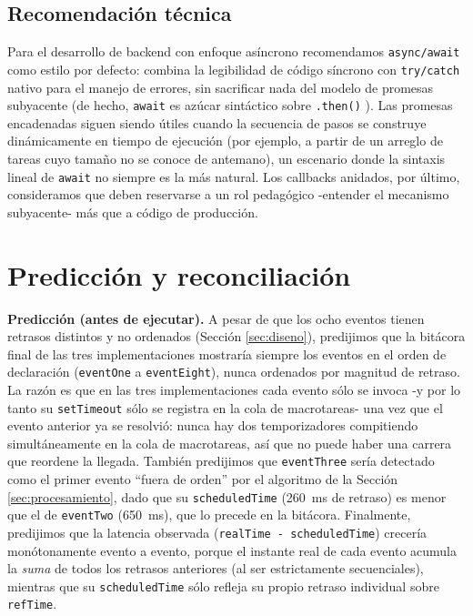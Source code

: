 \documentclass[conference,a4paper]{IEEEtran}
\begin{document}
\subsection{Recomendaci\'on t\'ecnica}
Para el desarrollo de backend con enfoque as\'incrono recomendamos \texttt{async/await} como estilo por defecto: combina la legibilidad de c\'odigo s\'incrono con \texttt{try/catch} nativo para el manejo de errores, sin sacrificar nada del modelo de promesas subyacente (de hecho, \texttt{await} es az\'ucar sint\'actico sobre \texttt{.then()} \cite{mdn_promise}). Las promesas encadenadas siguen siendo \'utiles cuando la secuencia de pasos se construye din\'amicamente en tiempo de ejecuci\'on (por ejemplo, a partir de un arreglo de tareas cuyo tama\~no no se conoce de antemano), un escenario donde la sintaxis lineal de \texttt{await} no siempre es la m\'as natural. Los callbacks anidados, por \'ultimo, consideramos que deben reservarse a un rol pedag\'ogico -entender el mecanismo subyacente- m\'as que a c\'odigo de producci\'on.

\section{Predicci\'on y reconciliaci\'on}
\label{sec:prediccion}
\textbf{Predicci\'on (antes de ejecutar).} A pesar de que los ocho eventos tienen retrasos distintos y no ordenados (Secci\'on \ref{sec:diseno}), predijimos que la bit\'acora final de las tres implementaciones mostrar\'ia siempre los eventos en el orden de declaraci\'on (\texttt{eventOne} a \texttt{eventEight}), nunca ordenados por magnitud de retraso. La raz\'on es que en las tres implementaciones cada evento s\'olo se invoca -y por lo tanto su \texttt{setTimeout} s\'olo se registra en la cola de macrotareas- una vez que el evento anterior ya se resolvi\'o: nunca hay dos temporizadores compitiendo simult\'aneamente en la cola de macrotareas, as\'i que no puede haber una carrera que reordene la llegada. Tambi\'en predijimos que \texttt{eventThree} ser\'ia detectado como el primer evento ``fuera de orden'' por el algoritmo de la Secci\'on \ref{sec:procesamiento}, dado que su \texttt{scheduledTime} (260~ms de retraso) es menor que el de \texttt{eventTwo} (650~ms), que lo precede en la bit\'acora. Finalmente, predijimos que la latencia observada (\texttt{realTime - scheduledTime}) crecer\'ia mon\'otonamente evento a evento, porque el instante real de cada evento acumula la \emph{suma} de todos los retrasos anteriores (al ser estrictamente secuenciales), mientras que su \texttt{scheduledTime} s\'olo refleja su propio retraso individual sobre \texttt{refTime}.
\end{document}
